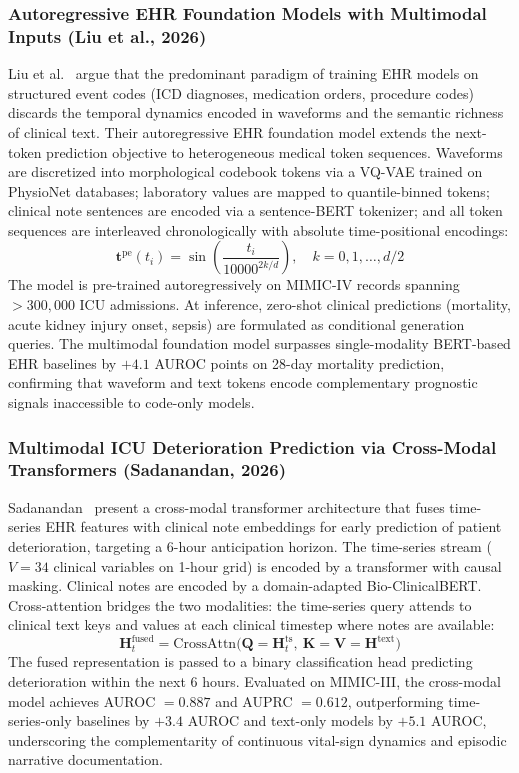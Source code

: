 \subsubsection{Autoregressive EHR Foundation Models with Multimodal Inputs (Liu et al., 2026)}
Liu et al.~\cite{Liu2026AutoregressiveEHR} argue that the predominant paradigm of training EHR models on structured event codes (ICD diagnoses, medication orders, procedure codes) discards the temporal dynamics encoded in waveforms and the semantic richness of clinical text. Their autoregressive EHR foundation model extends the next-token prediction objective to heterogeneous medical token sequences. Waveforms are discretized into morphological codebook tokens via a VQ-VAE trained on PhysioNet databases; laboratory values are mapped to quantile-binned tokens; clinical note sentences are encoded via a sentence-BERT tokenizer; and all token sequences are interleaved chronologically with absolute time-positional encodings:
\begin{equation}
    \mathbf{t}^{\text{pe}}(t_i) = \sin\!\left(\frac{t_i}{10000^{2k/d}}\right), \quad k = 0, 1, \ldots, d/2
\end{equation}
The model is pre-trained autoregressively on MIMIC-IV records spanning $>300{,}000$ ICU admissions. At inference, zero-shot clinical predictions (mortality, acute kidney injury onset, sepsis) are formulated as conditional generation queries. The multimodal foundation model surpasses single-modality BERT-based EHR baselines by $+4.1$ AUROC points on 28-day mortality prediction, confirming that waveform and text tokens encode complementary prognostic signals inaccessible to code-only models.

\subsubsection{Multimodal ICU Deterioration Prediction via Cross-Modal Transformers (Sadanandan, 2026)}
Sadanandan~\cite{Sadanandan2026MultimodalICU} present a cross-modal transformer architecture that fuses time-series EHR features with clinical note embeddings for early prediction of patient deterioration, targeting a 6-hour anticipation horizon. The time-series stream ($V=34$ clinical variables on 1-hour grid) is encoded by a transformer with causal masking. Clinical notes are encoded by a domain-adapted Bio-ClinicalBERT. Cross-attention bridges the two modalities: the time-series query attends to clinical text keys and values at each clinical timestep where notes are available:
\begin{equation}
    \mathbf{H}^{\text{fused}}_t = \text{CrossAttn}\bigl(\mathbf{Q} = \mathbf{H}^{\text{ts}}_t,\ \mathbf{K} = \mathbf{V} = \mathbf{H}^{\text{text}}\bigr)
\end{equation}
The fused representation is passed to a binary classification head predicting deterioration within the next 6 hours. Evaluated on MIMIC-III, the cross-modal model achieves AUROC $=0.887$ and AUPRC $=0.612$, outperforming time-series-only baselines by $+3.4$ AUROC and text-only models by $+5.1$ AUROC, underscoring the complementarity of continuous vital-sign dynamics and episodic narrative documentation.

